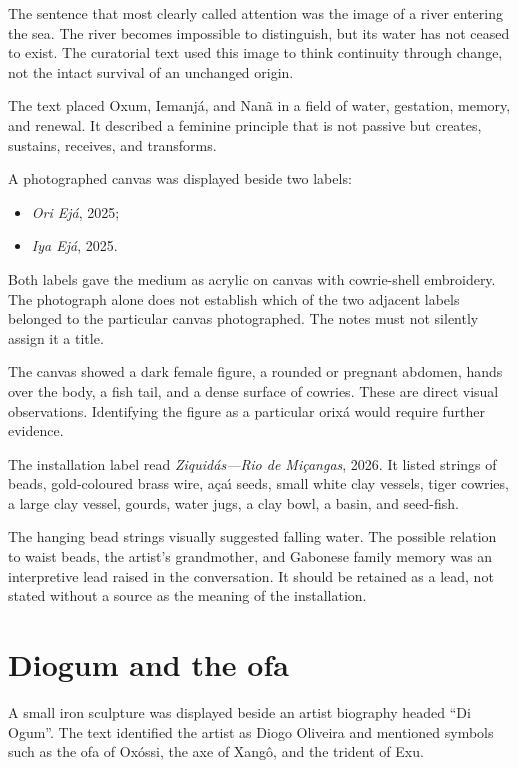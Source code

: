 The sentence that most clearly called
attention was the image of a river entering
the sea.  The river becomes impossible to
distinguish, but its water has not ceased
to exist.  The curatorial text used this
image to think continuity through change,
not the intact survival of an unchanged
origin.

The text placed Oxum, Iemanj\'a, and Nan\~a
in a field of water, gestation, memory,
and renewal.  It described a feminine
principle that is not passive but creates,
sustains, receives, and transforms.

A photographed canvas was displayed beside
two labels:

\begin{itemize}
\item \emph{Ori Ej\'a}, 2025;
\item \emph{Iya Ej\'a}, 2025.
\end{itemize}

Both labels gave the medium as acrylic on
canvas with cowrie-shell embroidery.  The
photograph alone does not establish which
of the two adjacent labels belonged to the
particular canvas photographed.  The notes
must not silently assign it a title.

The canvas showed a dark female figure,
a rounded or pregnant abdomen, hands over
the body, a fish tail, and a dense surface
of cowries.  These are direct visual
observations.  Identifying the figure as a
particular orix\'a would require further
evidence.

The installation label read
\emph{Ziquid\'as---Rio de Mi\c{c}angas},
2026.  It listed strings of beads,
gold-coloured brass wire, a\c{c}a\'\i{}
seeds, small white clay vessels, tiger
cowries, a large clay vessel, gourds, water
jugs, a clay bowl, a basin, and seed-fish.

The hanging bead strings visually suggested
falling water.  The possible relation to
waist beads, the artist's grandmother, and
Gabonese family memory was an interpretive
lead raised in the conversation.  It should
be retained as a lead, not stated without a
source as the meaning of the installation.

\section{Diogum and the ofa}

A small iron sculpture was displayed beside
an artist biography headed ``Di Ogum''.
The text identified the artist as Diogo
Oliveira and mentioned symbols such as the
ofa of Ox\'ossi, the axe of Xang\^o, and the
trident of Exu.

